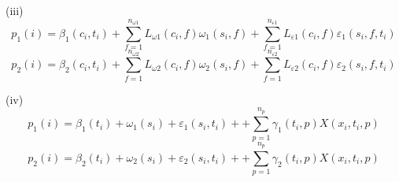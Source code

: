 \documentclass[12pt]{article}
\begin{document}
\hspace{1.2cm} (iii)
\begin{dmath}
  p_1(i) = \beta_{1}(c_{i}, t_{i}) + \sum_{f = 1}^{n_{\omega 1}} L_{\omega 1}(c_i, f) \omega_1(s_i, f) + \sum_{f = 1}^{n_{\varepsilon1}}L_{\varepsilon1}(c_i,f)\varepsilon_1(s_i,f,t_i)
\end{dmath}
\begin{dmath}
  p_2(i) = \beta_{2}(c_{i}, t_{i}) + \sum_{f = 1}^{n_{\omega 2}} L_{\omega 2}(c_i, f) \omega_2(s_i, f) + \sum_{f = 1}^{n_{\varepsilon2}}L_{\varepsilon2}(c_i,f)\varepsilon_2(s_i,f,t_i)
\end{dmath}
\hspace*{2cm}\dotfill

\hspace{1.2cm} (iv)
\begin{dmath}
  p_1(i) = \beta_{1}(t_{i}) + \omega_1(s_i) + \varepsilon_1(s_i,t_i) + +\sum_{p = 1}^{n_p}\gamma_1(t_i,p)X(x_i,t_i,p)
\end{dmath}
\begin{dmath}
  p_2(i) = \beta_{2}(t_{i}) + \omega_2(s_i) + \varepsilon_2(s_i,t_i) + +\sum_{p = 1}^{n_p}\gamma_2(t_i,p)X(x_i,t_i,p)
\end{dmath}

\end{document}
